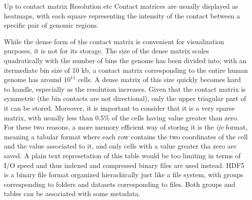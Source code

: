 Up to contact matrix
Resolution etc
Contact matrices are usually displayed as heatmaps, with each square representing the intensity of the contact between a specific pair of genomic regions.

While the dense form of the contact matrix is convenient for visualization purposes, it is not for its storage. The size of the dense matrix scales quadratically with the number of bins the genome has been divided into; with an itermediate bin size of 10 kb, a contact matrix corresponding to the entire human genome has around $10^{11}$ cells. A dense matrix of this size quickly becomes hard to handle, especially as the resolution increases.
Given that the contact matrix is symmetric (the bin contacts are not directional), only the upper triagular part of it can be stored. Moreover, it is important to consider that it is a very sparse matrix, with usually less than 0.5\% of the cells having value greater than zero. %
For these two reasons, a more memory efficient way of storing it is the \emph{ijv} format, meaning a tabular format where each row contains the two coordinates of the cell and the value associated to it, and only cells with a value greater tha zero are saved.
A plain text represetation of this table would be too limiting in terms of I/O speed and thus indexed and compressed binary files are used instead. HDF5 is a binary file format organized hierachically just like a file system, with groups corresponding to folders and datasets corresponding to files. Both groups and tables can be associated with some metadata. %


